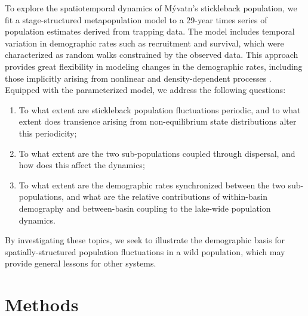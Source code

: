 \documentclass[11pt]{article}
\begin{document}
To explore the spatiotemporal dynamics of M\'{y}vatn's stickleback population, 
we fit a stage-structured metapopulation model \citep{caswell2001matrix}
to a 29-year times series of population estimates derived from trapping data.
The model includes temporal variation in demographic rates such as recruitment and survival,
which were characterized as random walks constrained by the observed data.
This approach provides great flexibility in modeling changes in the demographic rates,
including those implicitly arising from nonlinear and density-dependent processes
\citep{zeng1998, ives2012}.
Equipped with the parameterized model, we address the following questions:
%
\begin{enumerate}[label=(\alph*)]
\item
To what extent are stickleback population fluctuations periodic, 
and to what extent does transience arising from non-equilibrium state distributions
alter this periodicity;
%
\item
To what extent are the two sub-populations coupled through dispersal,
and how does this affect the dynamics; 
%
\item
To what extent are the demographic rates synchronized between the two sub-populations,
and what are the relative contributions of within-basin demography 
and between-basin coupling to the lake-wide population dynamics.
\end{enumerate}
%
By investigating these topics, 
we seek to illustrate the demographic basis for spatially-structured population fluctuations
in a wild population, 
which may provide general lessons for other systems. 





\section*{Methods} 



\end{document}
